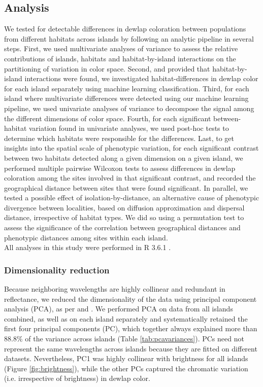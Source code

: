 \subsection*{Analysis}

We tested for detectable differences in dewlap coloration between populations from different habitats across islands by following an analytic pipeline in several steps. First, we used multivariate analyses of variance to assess the relative contributions of islands, habitats and habitat-by-island interactions on the partitioning of variation in color space. Second, and provided that habitat-by-island interactions were found, we investigated habitat-differences in dewlap color for each island separately using machine learning classification. Third, for each island where multivariate differences were detected using our machine learning pipeline, we used univariate analyses of variance to decompose the signal among the different dimensions of color space. Fourth, for each significant between-habitat variation found in univariate analyses, we used post-hoc tests to determine which habitats were responsible for the differences. Last, to get insights into the spatial scale of phenotypic variation, for each significant contrast between two habitats detected along a given dimension on a given island, we performed multiple pairwise Wilcoxon tests to assess differences in dewlap coloration among the sites involved in that significant contrast, and recorded the geographical distance between sites that were found significant. In parallel, we tested a possible effect of isolation-by-distance, an alternative cause of phenotypic divergence between localities, based on diffusion approximation and dispersal distance, irrespective of habitat types. We did so using a permutation test to assess the significance of the correlation between geographical distances and phenotypic distances among sites within each island.\\

All analyses in this study were performed in R 3.6.1 \citep{RCoreTeam2019}.

\subsubsection*{Dimensionality reduction}

Because neighboring wavelengths are highly collinear and redundant in reflectance, we reduced the dimensionality of the data using principal component analysis (PCA), as per \citet{Cuthill1999} and \citet{Leal2002}. We performed PCA on data from all islands combined, as well as on each island separately and systematically retained the first four principal components (PC), which together always explained more than $88.8\%$ of the variance across islands (Table \ref{tab:pcavariances}). PCs need not represent the same wavelengths across islands because they are fitted on different datasets. Nevertheless, PC1 was highly collinear with brightness for all islands (Figure \ref{fig:brightness}), while the other PCs captured the chromatic variation (i.e. irrespective of brightness) in dewlap color.

